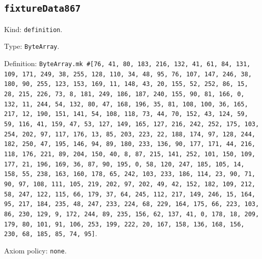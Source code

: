 \documentclass[11pt]{article}
\begin{document}
\subsection*{\texttt{fixtureData867}}
\noindent Kind: \texttt{definition}.\par
\noindent Type: \texttt{ByteArray}.\par
\noindent Definition: \texttt{ByteArray.mk \#[76, 41, 80, 183, 216, 132, 41, 61, 84, 131, 109, 171, 249, 38, 255, 128, 110, 34, 48, 95, 76, 107, 147, 246, 38, 180, 90, 255, 123, 153, 169, 11, 148, 43, 20, 155, 52, 252, 86, 15, 28, 215, 226, 73, 8, 181, 249, 186, 187, 240, 155, 90, 81, 166, 0, 132, 11, 244, 54, 132, 80, 47, 168, 196, 35, 81, 108, 100, 36, 165, 217, 12, 190, 151, 141, 54, 108, 118, 73, 44, 70, 152, 43, 124, 59, 59, 116, 41, 159, 47, 53, 127, 149, 165, 127, 216, 242, 252, 175, 103, 254, 202, 97, 117, 176, 13, 85, 203, 223, 22, 188, 174, 97, 128, 244, 182, 250, 47, 195, 146, 94, 89, 180, 233, 136, 90, 177, 171, 44, 216, 118, 176, 221, 89, 204, 150, 40, 8, 87, 215, 141, 252, 101, 150, 109, 177, 21, 196, 169, 36, 87, 90, 195, 0, 58, 120, 247, 185, 105, 14, 158, 55, 238, 163, 160, 178, 65, 242, 103, 233, 186, 114, 23, 90, 71, 90, 97, 108, 111, 105, 219, 202, 97, 202, 49, 42, 152, 182, 109, 212, 58, 247, 122, 115, 66, 179, 37, 64, 245, 112, 217, 149, 246, 15, 164, 95, 217, 184, 235, 48, 247, 233, 224, 68, 229, 164, 175, 66, 223, 103, 86, 230, 129, 9, 172, 244, 89, 235, 156, 62, 137, 41, 0, 178, 18, 209, 179, 80, 101, 91, 106, 253, 199, 222, 20, 167, 158, 136, 168, 156, 230, 68, 185, 85, 74, 95]}.\par
\noindent Axiom policy: \texttt{none}.\par
\end{document}
